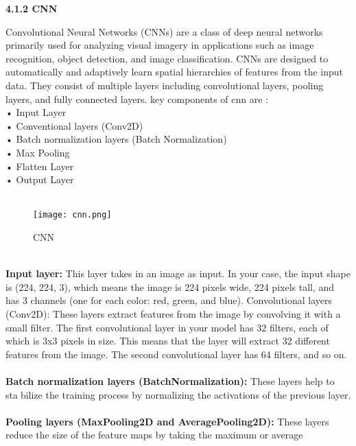 \documentclass[12pt, English]{article}
\newcommand\tab[1][1cm]{\hspace*{#1}}
\begin{document}
\newpage
\begin{large}
\textbf{4.1.2 CNN }\\
\end{large}
\tab
\text Convolutional Neural Networks (CNNs) are a class of deep neural networks primarily used for analyzing visual imagery in applications such as image recognition, object detection, and image classification. CNNs are designed to automatically and adaptively learn spatial hierarchies of features from the input data. They
consist of multiple layers including convolutional layers, pooling layers, and fully connected layers.
key components of cnn are :\\
• Input Layer\\
• Conventional layers (Conv2D)\\
• Batch normalization layers (Batch Normalization)\\
• Max Pooling\\
• Flatten Layer\\
• Output Layer\\
\\
\begin{figure}[htb]
\begin{center}
\texttt{[image: cnn.png]}
\end{center}
\begin{center}
\renewcommand{\thefigure}{4.2}
\caption{\footnotesize CNN }
\end{center}
\end{figure}\\
\textbf{Input layer: } This layer takes in an image as input. In your case, the input shape is (224, 224, 3), which means the image is 224 pixels wide, 224 pixels tall, and has 3 channels (one for each color: red, green, and blue). Convolutional layers (Conv2D): These layers extract features from the image by convolving it with a small filter. The first convolutional layer in your model has 32 filters, each of which is 3x3 pixels in size. This means that the layer will extract 32 different features from the image. The second convolutional layer has 64 filters, and so on.\\
\\
\textbf{Batch normalization layers (BatchNormalization): } These layers help to stabilize the training process by normalizing the activations of the previous layer.\\
\\
\textbf{Pooling layers (MaxPooling2D and AveragePooling2D): } These layers reduce the size of the feature maps by taking the maximum or average 
\end{document}
